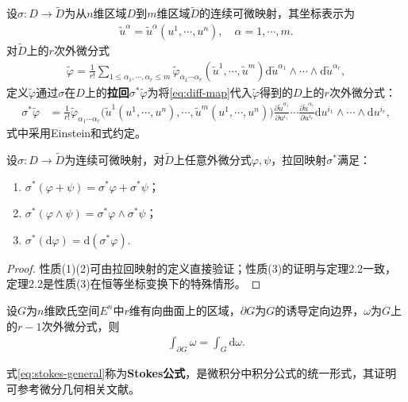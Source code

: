 \documentclass[../../main.tex]{subfiles}%
\begin{document}
\begin{definition}
设$\sigma:D\to\tilde{D}$为从$n$维区域$D$到$m$维区域$\tilde{D}$的连续可微映射，其坐标表示为
\begin{align}
\tilde{u}^\alpha = \tilde{u}^\alpha(u^1,\cdots,u^n),\quad \alpha=1,\cdots,m. \label{eq:diff-map}
\end{align}
对$\tilde{D}$上的$r$次外微分式
\begin{align*}
\tilde{\varphi} = \frac{1}{r!}\sum\limits_{1\leqslant\alpha_1,\cdots,\alpha_r\leqslant m}\tilde{\varphi}_{\alpha_1\cdots\alpha_r}(\tilde{u}^1,\cdots,\tilde{u}^m)\mathrm{d}\tilde{u}^{\alpha_1}\land\cdots\land\mathrm{d}\tilde{u}^{\alpha_r},
\end{align*}
定义$\tilde{\varphi}$通过$\sigma$在$D$上的\textbf{拉回}$\sigma^*\tilde{\varphi}$为将\eqref{eq:diff-map}代入$\tilde{\varphi}$得到的$D$上的$r$次外微分式：
\begin{align}
\sigma^*\tilde{\varphi} &= \frac{1}{r!}\tilde{\varphi}_{\alpha_1\cdots\alpha_r}\big(\tilde{u}^1(u^1,\cdots,u^n),\cdots,\tilde{u}^m(u^1,\cdots,u^n)\big)\frac{\partial\tilde{u}^{\alpha_1}}{\partial u^{i_1}}\cdots\frac{\partial\tilde{u}^{\alpha_r}}{\partial u^{i_r}}\mathrm{d}u^{i_1}\land\cdots\land\mathrm{d}u^{i_r}, \label{eq:pullback-def}
\end{align}
式中采用Einstein和式约定。
\end{definition}

\begin{theorem}
设$\sigma:D\to\tilde{D}$为连续可微映射，对$\tilde{D}$上任意外微分式$\varphi,\psi$，拉回映射$\sigma^*$满足：
\begin{enumerate}[(1)]
\item $\sigma^*(\varphi+\psi)=\sigma^*\varphi+\sigma^*\psi$；
\item $\sigma^*(\varphi\land\psi)=\sigma^*\varphi\land\sigma^*\psi$；
\item $\sigma^*(\mathrm{d}\varphi)=\mathrm{d}(\sigma^*\varphi)$.
\end{enumerate}
\end{theorem}
\begin{proof}

性质(1)(2)可由拉回映射的定义直接验证；性质(3)的证明与定理2.2一致，定理2.2是性质(3)在恒等坐标变换下的特殊情形。

\end{proof}

\begin{theorem}
设$G$为$n$维欧氏空间$E^n$中$r$维有向曲面上的区域，$\partial G$为$G$的诱导定向边界，$\omega$为$G$上的$r-1$次外微分式，则
\begin{align}
\int_{\partial G}\omega = \int_G\mathrm{d}\omega. \label{eq:stokes-general}
\end{align}
\end{theorem}
\begin{remark}
式\eqref{eq:stokes-general}称为\textbf{Stokes公式}，是微积分中积分公式的统一形式，其证明可参考微分几何相关文献。
\end{remark}
\end{document}
